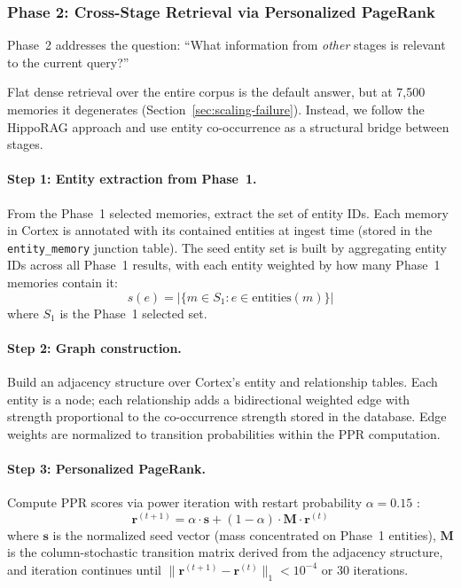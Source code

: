\documentclass[11pt]{article}
\begin{document}
\subsubsection{Phase 2: Cross-Stage Retrieval via Personalized PageRank}
\label{sec:phase2}

Phase~2 addresses the question: ``What information from \emph{other}
stages is relevant to the current query?''

Flat dense retrieval over the entire corpus is the default answer,
but at 7,500 memories it degenerates (Section~\ref{sec:scaling-failure}).
Instead, we follow the HippoRAG approach \citep{Gutierrez2024} and
use entity co-occurrence as a structural bridge between stages.

\paragraph{Step 1: Entity extraction from Phase~1.}
From the Phase~1 selected memories, extract the set of entity IDs.
Each memory in Cortex is annotated with its contained entities at
ingest time (stored in the \texttt{entity\_memory} junction table).
The seed entity set is built by aggregating entity IDs across all
Phase~1 results, with each entity weighted by how many Phase~1
memories contain it:
\begin{equation}
s(e) = |\{m \in S_1 : e \in \text{entities}(m)\}|
\label{eq:seed}
\end{equation}
where $S_1$ is the Phase~1 selected set.

\paragraph{Step 2: Graph construction.}
Build an adjacency structure over Cortex's entity and relationship
tables.  Each entity is a node; each relationship adds a bidirectional
weighted edge with strength proportional to the co-occurrence strength
stored in the database.  Edge weights are normalized to transition
probabilities within the PPR computation.

\paragraph{Step 3: Personalized PageRank.}
Compute PPR scores via power iteration with restart probability
$\alpha = 0.15$ \citep{Brin1998}:
\begin{equation}
\mathbf{r}^{(t+1)} = \alpha \cdot \mathbf{s} + (1 - \alpha) \cdot \mathbf{M} \cdot \mathbf{r}^{(t)}
\label{eq:ppr}
\end{equation}
where $\mathbf{s}$ is the normalized seed vector (mass concentrated
on Phase~1 entities), $\mathbf{M}$ is the column-stochastic
transition matrix derived from the adjacency structure, and iteration
continues until $\|\mathbf{r}^{(t+1)} - \mathbf{r}^{(t)}\|_1 < 10^{-4}$
or 30 iterations.
\end{document}
